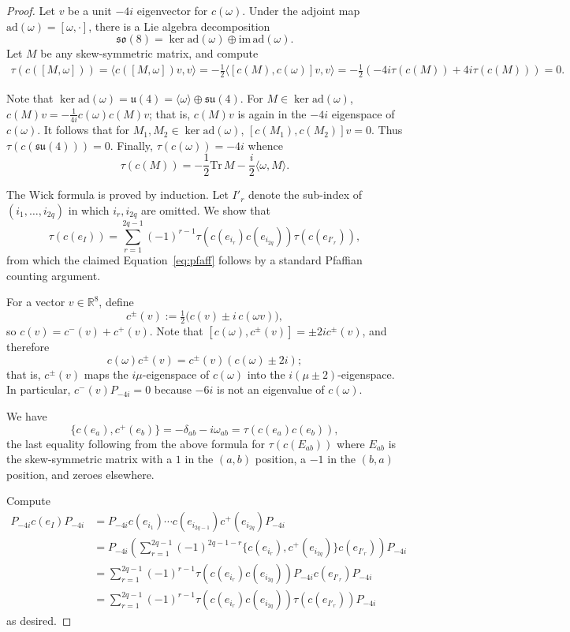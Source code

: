 \documentclass[10pt,a4paper]{amsart}
\newcommand{\ad}{\mathrm{ad}}
\newcommand{\real}{\mathbb{R}}
\newcommand{\so}{\mathfrak{so}}
\begin{document}
\begin{proof}
    Let $v$ be a unit $-4i$ eigenvector for $c(\omega)$.
    Under the adjoint map $\ad(\omega) = [\omega, \cdot]$, there is a Lie algebra decomposition
    \[
        \so(8) = \ker \ad(\omega) \oplus \mathrm{im}\, \ad(\omega).
    \]
    Let $M$ be any skew-symmetric matrix, and compute
    \begin{align*}
        \tau(c([M, \omega])) = \langle c([M, \omega])v, v \rangle = -\frac{1}{2} \langle [c(M), c(\omega)]v, v \rangle = -\frac{1}{2} (-4i \tau(c(M)) + 4i \tau(c(M))) = 0. 
    \end{align*}

    Note that $\ker \ad(\omega) = \mathfrak{u}(4) = \langle \omega \rangle \oplus \mathfrak{su}(4)$.
    For $M \in \ker \ad(\omega)$, $c(M)v = -\frac{1}{4i} c(\omega) c(M) v$; that is, $c(M) v$ is again in the $-4i$ eigenspace of $c(\omega)$.
    It follows that for $M_1, M_2 \in \ker \ad(\omega)$, $[c(M_1), c(M_2)]v = 0$.
    Thus $\tau(c(\mathfrak{su}(4))) = 0$.
    Finally, $\tau(c(\omega)) = -4i$ whence
    \[
    \tau(c(M)) = -\frac{1}{2} \mathrm{Tr}\, M -\frac{i}{2} \langle \omega, M \rangle.
    \]

    The Wick formula is proved by induction.
    Let $I'_r$ denote the sub-index of $(i_1, \ldots, i_{2q})$ in which $i_r, i_{2q}$ are omitted.
    We show that
    \[
        \tau(c(e_I)) = \sum_{r=1}^{2q-1} (-1)^{r-1} \tau(c(e_{i_r}) c(e_{i_{2q}})) \tau(c(e_{I'_r})),
    \]
    from which the claimed Equation~\eqref{eq:pfaff} follows by a standard Pfaffian counting argument.

      For a vector $v \in \real^8$, define
    \[
        c^\pm(v) := \tfrac{1}{2}\big(c(v) \pm i\, c(\omega v)\big), 
    \]
    so $c(v) = c^-(v) + c^+(v)$.
    Note that $[c(\omega), c^\pm(v)] = \pm 2i c^\pm(v)$, and therefore
    \[
        c(\omega) c^\pm(v) = c^\pm(v) ( c(\omega) \pm 2i );
    \]
    that is, $c^\pm(v)$ maps the $i\mu$-eigenspace of $c(\omega)$ into the $i(\mu \pm 2)$-eigenspace.
    In particular, $c^-(v) P_{-4i} = 0$ because $-6i$ is not an eigenvalue of $c(\omega)$.

    We have
    \[
        \{ c(e_a), c^+(e_b) \} = -\delta_{ab} - i \omega_{ab} = \tau(c(e_a) c(e_b)),
    \]
    the last equality following from the above formula for $\tau(c(E_{ab}))$ where $E_{ab}$ is the skew-symmetric matrix with a $1$ in the $(a,b)$ position, a $-1$ in the $(b,a)$ position, and zeroes elsewhere.

    Compute
    \begin{align*}
        P_{-4i} c(e_I) P_{-4i} &= P_{-4i} c(e_{i_1}) \cdots c(e_{i_{2q-1}}) c^+(e_{i_{2q}}) P_{-4i} \\
                               &= P_{-4i} \left(\sum_{r=1}^{2q-1} (-1)^{2q-1-r} \{c(e_{i_r}), c^+(e_{i_{2q}}) \} c(e_{I'_r})\right) P_{-4i} \\
                               &= \sum_{r=1}^{2q-1} (-1)^{r-1} \tau(c(e_{i_r})c(e_{i_{2q}}))P_{-4i} c(e_{I'_r}) P_{-4i} \\
                               &= \sum_{r=1}^{2q-1} (-1)^{r-1} \tau(c(e_{i_r})c(e_{i_{2q}}))\tau(c(e_{I'_r})) P_{-4i}
    \end{align*}
    as desired.
\end{proof}
\end{document}
